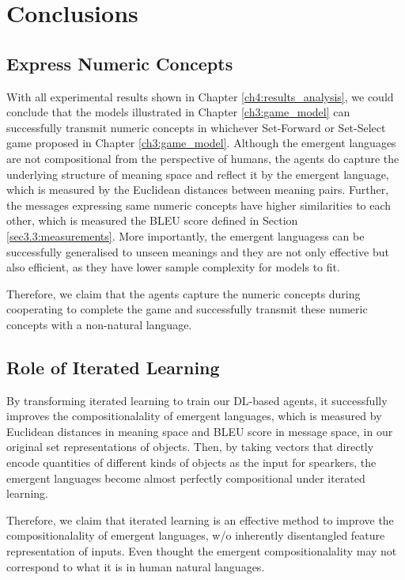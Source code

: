 \chapter{Conclusions}
\label{ch5:conclusion}

\section{Express Numeric Concepts}
\label{sec5.1:numeric_represent}

With all experimental results shown in Chapter \ref{ch4:results_analysis}, we could conclude that the models illustrated in Chapter \ref{ch3:game_model} can successfully transmit numeric concepts in whichever Set-Forward or Set-Select game proposed in Chapter \ref{ch3:game_model}. Although the emergent languages are not compositional from the perspective of humans, the agents do capture the underlying structure of meaning space and reflect it by the emergent language, which is measured by the Euclidean distances between meaning pairs. Further, the messages expressing same numeric concepts have higher similarities to each other, which is measured the BLEU score defined in Section \ref{sec3.3:measurements}. More importantly, the emergent languagess can be successfully generalised to unseen meanings and they are not only effective but also efficient, as they have lower sample complexity for models to fit.

Therefore, we claim that the agents capture the numeric concepts during cooperating to complete the game and successfully transmit these numeric concepts with a non-natural language.

\section{Role of Iterated Learning}
\label{sec5.2:iterated_learning}

By transforming iterated learning to train our DL-based agents, it successfully improves the compositionalality of emergent languages, which is measured by Euclidean distances in meaning space and BLEU score in message space, in our original set representations of objects. Then, by taking vectors that directly encode quantities of different kinds of objects as the input for spearkers, the emergent languages become almost perfectly compositional under iterated learning.

Therefore, we claim that iterated learning is an effective method to improve the compositionalality of emergent languages, w/o inherently disentangled feature representation of inputs. Even thought the emergent compositionalality may not correspond to what it is in human natural languages.

